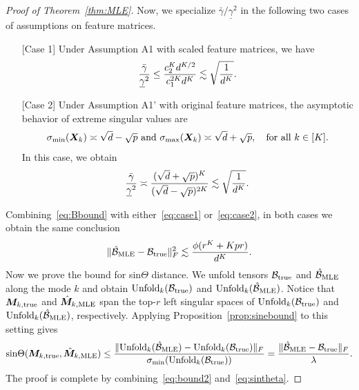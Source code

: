 \documentclass[12pt]{article}
\theoremstyle{definition}
\begin{document}
\begin{proof}[Proof of Theorem~\ref{thm:MLE}]
Now, we specialize $\bar \gamma/\underline{\gamma}^2 $ in the following two cases of assumptions on feature matrices. 
\begin{itemize}[leftmargin=0cm]
\item[] [Case 1] Under Assumption A1 with scaled feature matrices, we have
\begin{equation}\label{eq:case1}
{\bar \gamma\over \underline{\gamma}^2} \leq {c^K_2d^{K/2} \over c^{2K}_1d^{K}} \lesssim \sqrt{1\over d^{K}}.
\end{equation}
\item[] [Case 2] Under Assumption A1' with original feature matrices, the asymptotic behavior of extreme singular values \citep{rudelson2010non} are
\[
\sigma_{\min}(\bm X_k) \asymp \sqrt{d}-\sqrt{p} \text{ and  } \sigma_{\max}(\bm X_k) \asymp \sqrt{d}+\sqrt{p},\quad \text{for all }k\in[K].
\]
In this case, we obtain 
\begin{equation}\label{eq:case2}
{\bar \gamma\over \underline{\gamma}^2} \asymp {(\sqrt{d}+\sqrt{p})^{K} \over (\sqrt{d}-\sqrt{p})^{2K}} \lesssim \sqrt{1\over d^K}.
\end{equation}
\end{itemize}
Combining~\eqref{eq:Bbound} with either~\eqref{eq:case1} or~\eqref{eq:case2}, in both cases we obtain the same conclusion
\begin{equation}\label{eq:bound2}
\lVert\mathcal{\hat B}_{\textup{MLE}}-\mathcal{B}_{\textup{true}}\rVert_F^2\lesssim {\phi(r^K+Kpr)\over d^K}.
\end{equation}
Now we prove the bound for sin$\Theta$ distance. 
We unfold tensors $\mathcal{B}_{\textup{true}}$ and $\mathcal{\hat B}_{\textup{MLE}}$ along the mode $k$ and obtain $\text{Unfold}_k(\mathcal{B}_{\textup{true}})$ and $\text{Unfold}_k(\mathcal{\hat B}_{\textup{MLE}})$. Notice that $\bm M_{k,\textup{true}}$ and $\hat {\bm M}_{k,\textup{MLE}}$ span the top-$r$ left singular spaces of $\text{Unfold}_k(\mathcal{B}_{\textup{true}})$ and $\text{Unfold}_k(\mathcal{\hat B}_{\textup{MLE}})$, respectively.  Applying Proposition~\ref{prop:sinebound} to this setting gives
\begin{align}\label{eq:sintheta}
    \text{sin}\Theta(\bm M_{k,\textup{true}},\hat{\bm M}_{k,\textup{MLE}})\leq \frac{\lVert\text{Unfold}_k(\mathcal{\hat B}_{\textup{MLE}})-\text{Unfold}_k(\mathcal{B}_{\textup{true}})\rVert_F}{\sigma_{\text{min}}(\text{Unfold}_k(\mathcal{B}_{\textup{true}}))}= \frac{\lVert\mathcal{\hat B}_{\textup{MLE}}-\mathcal{B}_{\textup{true}}\rVert_F}{\lambda}.
    \end{align}
The proof is complete by combining~\eqref{eq:bound2} and~\eqref{eq:sintheta}.
\end{proof}
\end{document}
